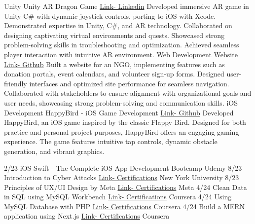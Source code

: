 \documentclass[9pt]{developercv} %
\begin{document}
\vspace{-20 pt}
\begin{entrylist}
    \entry
		{Unity}
		{Unity AR Dragon Game}
		{{\href{https://www.linkedin.com/feed/update/urn:li:activity:7193535905696018432/}{Link- Linkedin}}}
		{Developed immersive AR game in Unity C\# with dynamic joystick controls, porting to iOS with Xcode. Demonstrated expertise in Unity, C\#, and AR technology. Collaborated on designing captivating virtual environments and quests. Showcased strong problem-solving skills in troubleshooting and optimization. Achieved seamless player interaction with intuitive AR environment.}
    \entry
		{Web Development}
		{Website}
		{{\href{https://github.com/Iamyashsiwach/SmileFoundationSociety_website.git}{Link- Github}}}
		{Built a website for an NGO, implementing features such as donation portals, event calendars, and volunteer sign-up forms. Designed user-friendly interfaces and optimized site performance for seamless navigation. Collaborated with stakeholders to ensure alignment with organizational goals and user needs, showcasing strong problem-solving and communication skills.}
	\entry
		{iOS Development}
		{HappyBird - iOS Game Development}
		{{\href{https://github.com/Iamyashsiwach/HappyBird}{Link- Github}}}
		{Developed HappyBird, an iOS game inspired by the classic Flappy Bird. Designed for both practice and personal project purposes, HappyBird offers an engaging gaming experience. The game features intuitive tap controls, dynamic obstacle generation, and vibrant graphics.}
    
\end{entrylist}

\vspace{-20 pt}
\begin{entrylist}
  
  \entry
		{2/23}
		{iOS Swift - The Complete iOS App Development Bootcamp }
		{}
		{Udemy}
	\entry
		{8/23}
		{Introduction to Cyber Attacks }
	    {{\href{https://coursera.org/verify/8W8PWE46S26X}{Link- Certifications}}}
		{New York University}
  \entry
		{8/23}
		{Principles of UX/UI Design by Meta }
	    {{\href{https://coursera.org/verify/WCEKDRQCCW4B}{Link- Certifications}}}
		{Meta}
    \entry
		{4/24}
		{Clean Data in SQL using MySQL Workbench}
	    {{\href{https://coursera.org/verify/XGVP9YAUKMXT}{Link- Certifications}}}
		{Coursera}
  \entry
		{4/24}
		{Using MySQL Database with PHP}
	    {{\href{https://coursera.org/verify/XMQ936YYLDE3}{Link- Certifications}}}
		{Coursera}
    \entry
		{4/24}
		{Build a MERN application using Next.js}
	    {{\href{https://coursera.org/verify/HQUKBXN7T99S}{Link- Certifications}}}
		{Coursera}
\end{entrylist}
\end{document}
